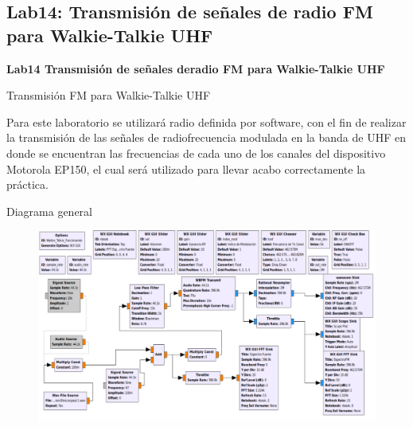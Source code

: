 \subsection{Lab14: Transmisión de señales de radio FM para Walkie-Talkie UHF}

\begin{frame}{}


\bfseries{\textrm{\LARGE Lab14 \newline \Large Transmisión de señales de\newline radio FM para Walkie-Talkie \newline UHF 
}}
\raggedright
\end{frame}


\begin{frame}{Transmisión FM para Walkie-Talkie UHF}


Para este laboratorio se utilizará radio definida por software, con el fin de realizar la transmisión de las señales de radiofrecuencia modulada en la banda de UHF en donde se encuentran las frecuencias de cada uno de los canales del dispositivo Motorola EP150, el cual será utilizado para llevar acabo correctamente la práctica.
\end{frame}

\begin{frame}{Diagrama general}

\begin{figure}[H]
\centering
\vspace{-1mm}
\includegraphics[width=\textwidth]{parte3/lab14/pdf/Lab14_2.pdf}
\end{figure}

\end{frame}

